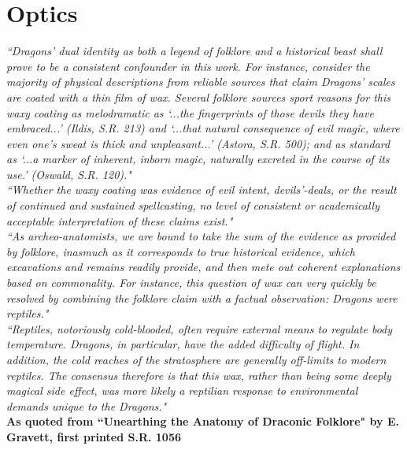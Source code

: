 

\chapter{Optics}
\textit{``Dragons' dual identity as both a legend of folklore and a historical beast shall prove to be a consistent confounder in this work. 
For instance, consider the majority of physical descriptions from reliable sources that claim Dragons' scales are coated with a thin film of wax.
Several folklore sources sport reasons for this waxy coating as melodramatic as `...the fingerprints of those devils they have embraced...' (Ildis, S.R. 213) and `...that natural consequence of evil magic, where even one's sweat is thick and unpleasant...' (Astora, S.R. 500); and as standard as `...a marker of inherent, inborn magic, naturally excreted in the course of its use.' (Oswald, S.R. 120)."} \\

\textit{``Whether the waxy coating was evidence of evil intent, devils'-deals, or the result of continued and sustained spellcasting, no level of consistent or academically acceptable interpretation of these claims exist."}\\

\textit{``As archeo-anatomists, we are bound to take the sum of the evidence as provided by folklore, inasmuch as it corresponds to true historical evidence, which excavations and remains readily provide, and then mete out coherent explanations based on commonality.
For instance, this question of wax can very quickly be resolved by combining the folklore claim with a factual observation: Dragons were reptiles."}\\

\textit{``Reptiles, notoriously cold-blooded, often require external means to regulate body temperature.
Dragons, in particular, have the added difficulty of flight. In addition, the cold reaches of the stratosphere are generally off-limits to modern reptiles.
The consensus therefore is that this wax, rather than being some deeply magical side effect, was more likely a reptilian response to environmental demands unique to the Dragons."}\\

\vspace{1mm}
\textbf{As quoted from ``Unearthing the Anatomy of Draconic Folklore" by E. Gravett, first printed S.R. 1056}

